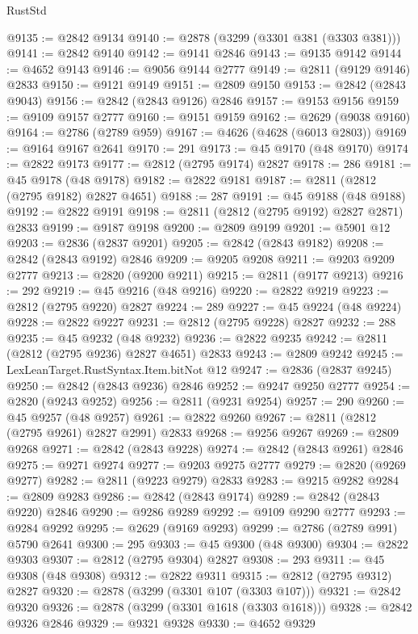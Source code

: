 \begin{lexlean}{RustStd}
\begin{coremodule}
{\begin{coremodule}
{{{{{{{{{{{{{{{{{{{{{{{{{{{{{{{{{@9135 := @2842 @9134
@9140 := @2878 (@3299 (@3301 @381 (@3303 @381)))
@9141 := @2842 @9140
@9142 := @9141 @2846
@9143 := @9135 @9142
@9144 := @4652 @9143
@9146 := @9056 @9144 @2777
@9149 := @2811 (@9129 @9146) @2833
@9150 := @9121 @9149
@9151 := @2809 @9150
@9153 := @2842 (@2843 @9043)
@9156 := @2842 (@2843 @9126) @2846
@9157 := @9153 @9156
@9159 := @9109 @9157 @2777
@9160 := @9151 @9159
@9162 := @2629 (@9038 @9160)
@9164 := @2786 (@2789 @959)
@9167 := @4626 (@4628 (@6013 @2803))
@9169 := @9164 @9167 @2641
@9170 := 291
@9173 := @45 @9170 (@48 @9170)
@9174 := @2822 @9173
@9177 := @2812 (@2795 @9174) @2827
@9178 := 286
@9181 := @45 @9178 (@48 @9178)
@9182 := @2822 @9181
@9187 := @2811 (@2812 (@2795 @9182) @2827 @4651)
@9188 := 287
@9191 := @45 @9188 (@48 @9188)
@9192 := @2822 @9191
@9198 := @2811 (@2812 (@2795 @9192) @2827 @2871) @2833
@9199 := @9187 @9198
@9200 := @2809 @9199
@9201 := @5901 @12
@9203 := @2836 (@2837 @9201)
@9205 := @2842 (@2843 @9182)
@9208 := @2842 (@2843 @9192) @2846
@9209 := @9205 @9208
@9211 := @9203 @9209 @2777
@9213 := @2820 (@9200 @9211)
@9215 := @2811 (@9177 @9213)
@9216 := 292
@9219 := @45 @9216 (@48 @9216)
@9220 := @2822 @9219
@9223 := @2812 (@2795 @9220) @2827
@9224 := 289
@9227 := @45 @9224 (@48 @9224)
@9228 := @2822 @9227
@9231 := @2812 (@2795 @9228) @2827
@9232 := 288
@9235 := @45 @9232 (@48 @9232)
@9236 := @2822 @9235
@9242 := @2811 (@2812 (@2795 @9236) @2827 @4651) @2833
@9243 := @2809 @9242
@9245 := LexLeanTarget.RustSyntax.Item.bitNot @12
@9247 := @2836 (@2837 @9245)
@9250 := @2842 (@2843 @9236) @2846
@9252 := @9247 @9250 @2777
@9254 := @2820 (@9243 @9252)
@9256 := @2811 (@9231 @9254)
@9257 := 290
@9260 := @45 @9257 (@48 @9257)
@9261 := @2822 @9260
@9267 := @2811 (@2812 (@2795 @9261) @2827 @2991) @2833
@9268 := @9256 @9267
@9269 := @2809 @9268
@9271 := @2842 (@2843 @9228)
@9274 := @2842 (@2843 @9261) @2846
@9275 := @9271 @9274
@9277 := @9203 @9275 @2777
@9279 := @2820 (@9269 @9277)
@9282 := @2811 (@9223 @9279) @2833
@9283 := @9215 @9282
@9284 := @2809 @9283
@9286 := @2842 (@2843 @9174)
@9289 := @2842 (@2843 @9220) @2846
@9290 := @9286 @9289
@9292 := @9109 @9290 @2777
@9293 := @9284 @9292
@9295 := @2629 (@9169 @9293)
@9299 := @2786 (@2789 @991) @5790 @2641
@9300 := 295
@9303 := @45 @9300 (@48 @9300)
@9304 := @2822 @9303
@9307 := @2812 (@2795 @9304) @2827
@9308 := 293
@9311 := @45 @9308 (@48 @9308)
@9312 := @2822 @9311
@9315 := @2812 (@2795 @9312) @2827
@9320 := @2878 (@3299 (@3301 @107 (@3303 @107)))
@9321 := @2842 @9320
@9326 := @2878 (@3299 (@3301 @1618 (@3303 @1618)))
@9328 := @2842 @9326 @2846
@9329 := @9321 @9328
@9330 := @4652 @9329
}}}}}}}}}}}}}}}}}}}}}}}}}}}}}}}}}
\end{coremodule}}
\end{coremodule}
\end{lexlean}
